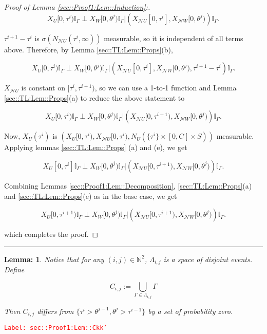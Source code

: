 \documentclass[12pt]{article}
\newcommand{\mb}{\mathbb}
\newcommand{\mc}{\mathcal}
\newcommand{\tr}{\textcolor{red}}
\newcommand{\labe}[1]{\tr{\texttt{Label: #1}}}
\newcommand{\lin}{\rule{\linewidth}{0.4 pt}}
\newcommand{\neigh}{\mc{N}}					%
\renewcommand{\U}{U}							%
\newcommand{\UU}{W}								%
\renewcommand{\S}{S}							%
\newcommand{\poiss}[1]{N_{#1}}						%
\newcommand{\rt}[1]{\tau^{#1}}						%
\newcommand{\rtt}[1]{\theta^{#1}}					%
\newcommand{\itt}{i}								%
\newcommand{\ittt}{j}								%
\newcommand{\rxvt}[2]{X_{#1}{(#2)}}					%
\newcommand{\rxvts}[2]{X_{#1}{#2}}					%
\newcommand{\const}[1]{C_{#1}}						%
\newcommand{\apath}{\Gamma}						%
\newcommand{\pathset}[2]{\Lambda_{#1,#2}}			%
\newcommand{\pathsete}[2]{C_{#1,#2}}			%
\newtheorem{lem}[thms]{Lemma: }
\begin{document}
\begin{proof}[Proof of Lemma \ref{sec::Proof1:Lem::Induction}:]
\[\rxvts{\U}{[0,\rt{\itt})}\mb{I}_{\apath}\perp \rxvts{\UU}{[0,\rtt{\ittt})}\mb{I}_{\apath}|\left(\rxvts{\neigh{\U}}{[0,\rt{\itt}]},\rxvts{\neigh{\UU}}{[0,\rtt{\ittt})}\right)\mb{I}_{\apath}.\]

\(\rt{\itt+1} - \rt{\itt}\) is \(\sigma(\poiss{\neigh{\U}}(\rt{\itt},\infty))\) measurable, so it is independent of all terms above. Therefore, by Lemma \ref{sec::TL:Lem::Props}(b),

\[\rxvts{\U}{[0,\rt{\itt})}\mb{I}_{\apath}\perp \rxvts{\UU}{[0,\rtt{\ittt})}\mb{I}_{\apath}|\left(\rxvts{\neigh{\U}}{[0,\rt{\itt}]},\rxvts{\neigh{\UU}}{[0,\rtt{\ittt})},\rt{\itt+1} - \rt{\itt}\right)\mb{I}_{\apath}.\]

\(\rxvts{\neigh{\U}}{}\) is constant on \([\rt{\itt},\rt{\itt+1})\), so we can use a 1-to-1 function and Lemma \ref{sec::TL:Lem::Props}(a) to reduce the above statement to

\[\rxvts{\U}{[0,\rt{\itt})}\mb{I}_{\apath}\perp \rxvts{\UU}{[0,\rtt{\ittt})}\mb{I}_{\apath}|\left(\rxvts{\neigh{\U}}{[0,\rt{\itt+1})},\rxvts{\neigh{\UU}}{[0,\rtt{\ittt})}\right)\mb{I}_{\apath}.\]

Now, \(\rxvt{\U}{\rt{\itt}}\) is \(\left(\rxvts{\U}{[0,\rt{\itt})}, \rxvts{\neigh{\U}}{[0,\rt{\itt})}, \poiss{\U}(\{\rt{\itt}\}\times [0,\const{}]\times\S)\right)\) measurable. Applying lemmas \ref{sec::TL:Lem::Props} (a) and (e), we get

\[\rxvts{\U}{[0,\rt{\itt}]}\mb{I}_{\apath}\perp \rxvts{\UU}{[0,\rtt{\ittt})}\mb{I}_{\apath}|\left(\rxvts{\neigh{\U}}{[0,\rt{\itt+1})},\rxvts{\neigh{\UU}}{[0,\rtt{\ittt})}\right)\mb{I}_{\apath}.\]

Combining Lemmas \ref{sec::Proof1:Lem::Decomposition}, \ref{sec::TL:Lem::Props}(a) and \ref{sec::TL:Lem::Props}(e) as in the base case, we get

\[\rxvts{\U}{[0,\rt{\itt+1})}\mb{I}_{\apath}\perp \rxvts{\UU}{[0,\rtt{\ittt})}\mb{I}_{\apath}|\left(\rxvts{\neigh{\U}}{[0,\rt{\itt+1})},\rxvts{\neigh{\UU}}{[0,\rtt{\ittt})}\right)\mb{I}_{\apath}.\]

which completes the proof.
\end{proof}

\lin

\begin{lem}
Notice that for any \((\itt,\ittt) \in \mb{N}^2\), \(\pathset{\itt}{\ittt}\) is a space of disjoint events. Define

\[\pathsete{\itt}{\ittt} := \bigcup_{\apath\in\pathset{\itt}{\ittt}} \apath\]

Then \(\pathsete{\itt}{\ittt}\) differs from \(\{\rt{\itt} > \rtt{\ittt-1}, \rtt{\ittt} > \rt{\itt-1}\}\) by a set of probability zero.
\label{sec::Proof1:Lem::Ckk'}
\end{lem}
\labe{sec::Proof1:Lem::Ckk'}
\end{document}
